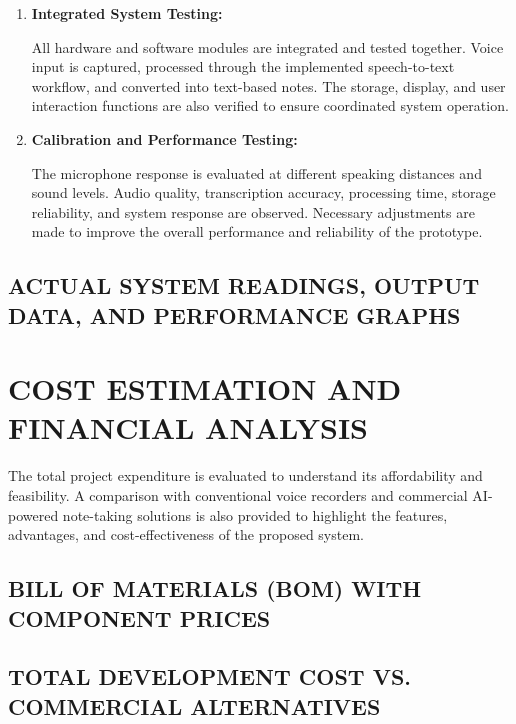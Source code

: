 \documentclass[a4paper,12pt,oneside]{report}
\begin{document}
\begin{enumerate}
    \item \textbf{Integrated System Testing:}

    All hardware and software modules are integrated and tested
    together. Voice input is captured, processed through the
    implemented speech-to-text workflow, and converted into
    text-based notes. The storage, display, and user interaction
    functions are also verified to ensure coordinated system
    operation.

    \item \textbf{Calibration and Performance Testing:}

    The microphone response is evaluated at different
    speaking distances and sound levels. Audio quality,
    transcription accuracy, processing time, storage reliability,
    and system response are observed. Necessary adjustments
    are made to improve the overall performance and reliability
    of the prototype.

\end{enumerate}

\vspace{3cm}


\section{ACTUAL SYSTEM READINGS, OUTPUT DATA, AND PERFORMANCE GRAPHS}

\newpage
\chapter{COST ESTIMATION AND FINANCIAL ANALYSIS}
The total project expenditure is evaluated to understand its affordability and feasibility. A comparison with conventional voice recorders and commercial AI-powered note-taking solutions is also provided to highlight the features, advantages, and cost-effectiveness of the proposed system.

\section{BILL OF MATERIALS (BOM) WITH COMPONENT PRICES}



\section{TOTAL DEVELOPMENT COST VS. COMMERCIAL ALTERNATIVES}
\end{document}
